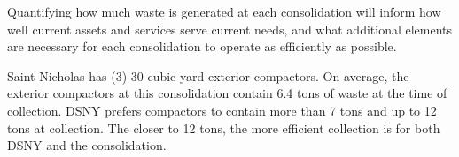 
    Quantifying how much waste is generated at each consolidation will inform how well current assets and services serve current needs, and what additional elements are necessary for each consolidation to operate as efficiently as possible.
    
    Saint Nicholas has (3) 30-cubic yard exterior compactors. On average, the exterior compactors at this consolidation contain 6.4 tons of waste at the time of collection. DSNY prefers compactors to contain more than 7 tons and up to 12 tons at collection. The closer to 12 tons, the more efficient collection is for both DSNY and the consolidation.